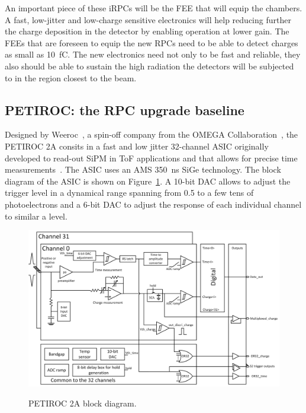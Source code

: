 	An important piece of these iRPCs will be the \acl{FEE} that will equip the chambers. A fast, low-jitter and low-charge sensitive electronics will help reducing further the charge deposition in the detector by enabling operation at lower gain. The FEEs that are foreseen to equip the new RPCs need to be able to detect charges as small as \SI{10}{fC}. The new electronics need not only to be fast and reliable, they also should be able to sustain the high radiation the detectors will be subjected to in the region closest to the beam.
	
	\subsection{PETIROC: the RPC upgrade baseline}
	\label{chapt6:ssec:RPCROC}
	
	Designed by Weeroc~\cite{WEEROC}, a spin-off company from the OMEGA Collaboration~\cite{OMEGA}, the PETIROC 2A consits in a fast and low jitter 32-channel ASIC originally developed to read-out \acf{SiPM} in \acl{ToF} applications and that allows for precise time measurements~\cite{PETIROCIEEE,PETIROCTWEPP}. The ASIC uses an AMS \SI{350}{ns} \acf{SiGe} technology. The block diagram of the ASIC is shown on Figure~\ref{fig:PETIROCASIC}. A 10-bit DAC allows to adjust the trigger level in a dynamical range spanning from 0.5 to a few tens of photoelectrons and a 6-bit DAC to adjust the response of each individual channel to similar a level.
	
	\begin{figure}[H]
		\centering
		\includegraphics[width = \linewidth]{fig/chapt6/petiroc2.png}\\
		\caption{\label{fig:PETIROCASIC} PETIROC 2A block diagram.}
	\end{figure}
	
